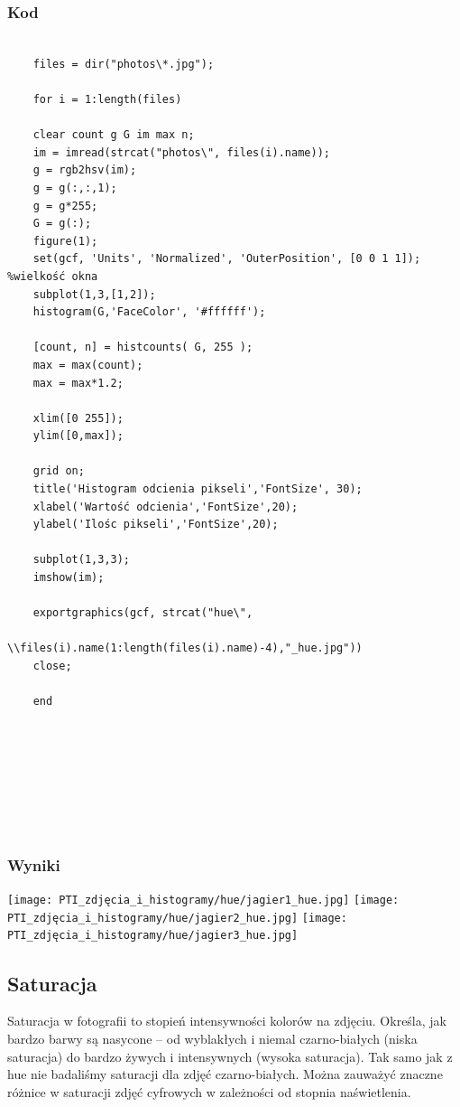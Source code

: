 \documentclass[options]{mwart}
\begin{document}
\subsubsection{Kod}


\begin{verbatim}
    
    files = dir("photos\*.jpg");
    
    for i = 1:length(files)
    
    clear count g G im max n;
    im = imread(strcat("photos\", files(i).name));
    g = rgb2hsv(im);
    g = g(:,:,1);
    g = g*255;
    G = g(:);
    figure(1);
    set(gcf, 'Units', 'Normalized', 'OuterPosition', [0 0 1 1]); %wielkość okna
    subplot(1,3,[1,2]); 
    histogram(G,'FaceColor', '#ffffff');
    
    [count, n] = histcounts( G, 255 );
    max = max(count);
    max = max*1.2;
    
    xlim([0 255]);
    ylim([0,max]);
    
    grid on;
    title('Histogram odcienia pikseli','FontSize', 30);
    xlabel('Wartość odcienia','FontSize',20);
    ylabel('Ilośc pikseli','FontSize',20);
    
    subplot(1,3,3);
    imshow(im);
    
    exportgraphics(gcf, strcat("hue\", 
                        \\files(i).name(1:length(files(i).name)-4),"_hue.jpg"))
    close;
    
    end
    
  
    
    
    
    
    
    \end{verbatim}
\newpage


\subsubsection{Wyniki}
\texttt{[image: PTI\_zdjęcia\_i\_histogramy/hue/jagier1\_hue.jpg]}
\texttt{[image: PTI\_zdjęcia\_i\_histogramy/hue/jagier2\_hue.jpg]}
\texttt{[image: PTI\_zdjęcia\_i\_histogramy/hue/jagier3\_hue.jpg]}



\newpage
\subsection{Saturacja}
Saturacja w fotografii to stopień intensywności kolorów na zdjęciu. Określa,
jak bardzo barwy są nasycone -- od wyblakłych i niemal czarno-białych (niska
saturacja) do bardzo żywych i intensywnych (wysoka saturacja). Tak samo jak z
hue nie badaliśmy saturacji dla zdjęć czarno-białych. Można zauważyć znaczne
różnice w saturacji zdjęć cyfrowych w zależności od stopnia naświetlenia.
\end{document}
